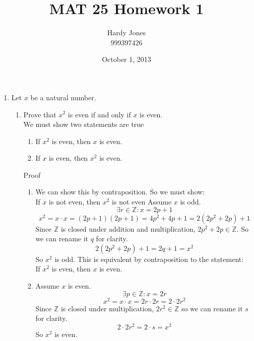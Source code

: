 \documentclass[12pt]{article}
\begin{document}
\title{MAT 25 Homework 1}
\author{Hardy Jones\\
        999397426}
\date{October 1, 2013}

\maketitle

\begin{enumerate}
    \item Let $x$ be a natural number.
    \begin{enumerate}
        \item Prove that $x^2$ is even if and only if $x$ is even. \\

            We must show two statements are true
            \begin{enumerate}
                \item If $x^2$ is even, then $x$ is even.
                \item If $x$ is even, then $x^2$ is even.
            \end{enumerate}

            Proof

            \begin{enumerate}
                \item
                    We can show this by contraposition.
                    So we must show: \\
                    If $x$ is not even, then $x^2$ is not even
                    Assume $x$ is odd.
                    \[\exists r \in \mathbb{Z} : x = 2p + 1\]
                    \[
                        x^2 = x \cdot x = (2p + 1) (2p + 1) = 4p^2 + 4p + 1 =
                        2(2p^2 + 2p) + 1
                    \]
                    Since $\mathbb{Z}$ is closed under addition and multiplication,
                    $2p^2 + 2p \in \mathbb{Z}$.
                    So we can rename it $q$ for clarity.
                    \[2(2p^2 + 2p) + 1 = 2q + 1 = x^2\]
                    So $x^2$ is odd.
                    This is equivalent by contraposition to the statement: \\
                    If $x^2$ is even, then $x$ is even.

                \item
                    Assume $x$ is even.
                    \[\exists p \in \mathbb{Z} : x = 2r\]
                    \[x^2 = x \cdot x = 2r \cdot 2r = 2 \cdot 2r^2\]
                    Since $\mathbb{Z}$ is closed under multiplication,
                    $2r^2 \in \mathbb{Z}$ so we can rename it $s$ for clarity.
                    \[2 \cdot 2r^2 = 2 \cdot s = x^2\]
                    So $x^2$ is even.
            \end{enumerate}


\end{enumerate}
\end{enumerate}
\end{document}
